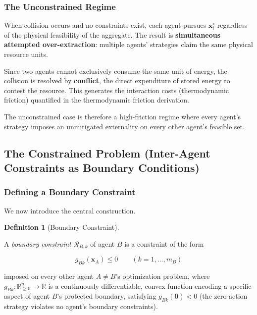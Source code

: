 \documentclass[11pt]{article}
\theoremstyle{plain}
\theoremstyle{definition}
\newtheorem{definition}{Definition}
\theoremstyle{remark}
\let\origsubsection\subsection
\renewcommand{\subsection}{\needspace{7\baselineskip}\origsubsection}
\let\origsubsubsection\subsubsection
\renewcommand{\subsubsection}{\needspace{4\baselineskip}\origsubsubsection}
\begin{document}
\subsubsection{The Unconstrained Regime}\label{the-unconstrained-regime}

When collision occurs and no constraints exist, each agent pursues
\(\mathbf{x}_i^{\circ}\) regardless of the physical feasibility of the
aggregate. The result is \textbf{simultaneous attempted
over-extraction}: multiple agents' strategies claim the same physical
resource units.

Since two agents cannot exclusively consume the same unit of energy, the
collision is resolved by \textbf{conflict}, the direct expenditure of
stored energy to contest the resource. This generates the interaction
costs (thermodynamic friction) quantified in the thermodynamic friction
derivation.

The unconstrained case is therefore a high-friction regime where every
agent's strategy imposes an unmitigated externality on every other
agent's feasible set.

\subsection{The Constrained Problem (Inter-Agent Constraints as Boundary
Conditions)}\label{the-constrained-problem-inter-agent-constraints-as-boundary-conditions}

\subsubsection{Defining a Boundary
Constraint}\label{defining-a-boundary-constraint}

We now introduce the central construction.

\begin{definition}[Boundary Constraint]
\label{def-boundary-constraint}

A \emph{boundary constraint} $\mathcal{R}_{B,k}$ of agent $B$ is a constraint of the form

$$g_{Bk}(\mathbf{x}_A) \leq 0 \qquad (k = 1, \ldots, m_B)$$

imposed on every other agent $A \neq B$'s optimization problem, where $g_{Bk} : \mathbb{R}_{\geq 0}^n \to \mathbb{R}$ is a continuously differentiable, convex function encoding a specific aspect of agent $B$'s protected boundary, satisfying $g_{Bk}(\mathbf{0}) < 0$ (the zero-action strategy violates no agent's boundary constraints).
\end{definition}
\end{document}
